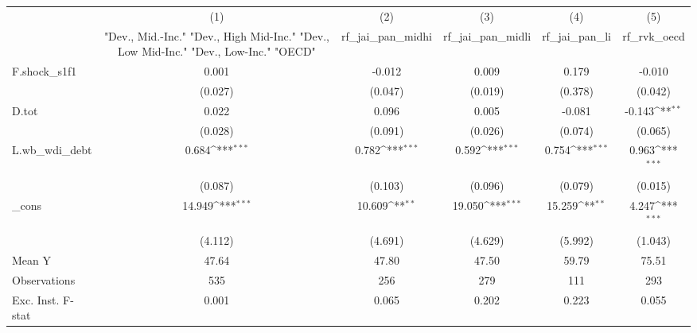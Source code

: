 {
\def\sym#1{\ifmmode^{#1}\else\(^{#1}\)\fi}
\begin{tabular}{l*{5}{c}}
\toprule
            &\multicolumn{1}{c}{(1)}&\multicolumn{1}{c}{(2)}&\multicolumn{1}{c}{(3)}&\multicolumn{1}{c}{(4)}&\multicolumn{1}{c}{(5)}\\
            &\multicolumn{1}{c}{ "Dev., Mid.-Inc." "Dev., High Mid-Inc." "Dev., Low Mid-Inc." "Dev., Low-Inc." "OECD" }&\multicolumn{1}{c}{rf\_jai\_pan\_midhi}&\multicolumn{1}{c}{rf\_jai\_pan\_midli}&\multicolumn{1}{c}{rf\_jai\_pan\_li}&\multicolumn{1}{c}{rf\_rvk\_oecd}\\
\midrule
F.shock\_s1f1&       0.001         &      -0.012         &       0.009         &       0.179         &      -0.010         \\
            &     (0.027)         &     (0.047)         &     (0.019)         &     (0.378)         &     (0.042)         \\
\addlinespace
D.tot       &       0.022         &       0.096         &       0.005         &      -0.081         &      -0.143\sym{**} \\
            &     (0.028)         &     (0.091)         &     (0.026)         &     (0.074)         &     (0.065)         \\
\addlinespace
L.wb\_wdi\_debt&       0.684\sym{***}&       0.782\sym{***}&       0.592\sym{***}&       0.754\sym{***}&       0.963\sym{***}\\
            &     (0.087)         &     (0.103)         &     (0.096)         &     (0.079)         &     (0.015)         \\
\addlinespace
\_cons      &      14.949\sym{***}&      10.609\sym{**} &      19.050\sym{***}&      15.259\sym{**} &       4.247\sym{***}\\
            &     (4.112)         &     (4.691)         &     (4.629)         &     (5.992)         &     (1.043)         \\
\midrule
Mean Y      &       47.64         &       47.80         &       47.50         &       59.79         &       75.51         \\
Observations&         535         &         256         &         279         &         111         &         293         \\
Exc. Inst. F-stat&       0.001         &       0.065         &       0.202         &       0.223         &       0.055         \\
\bottomrule
\end{tabular}
}
